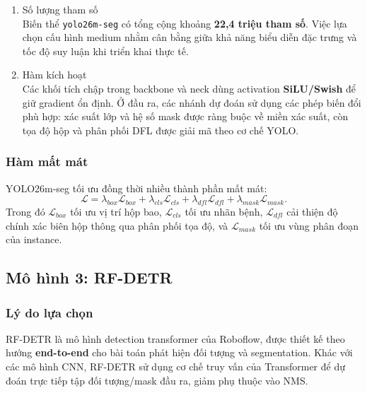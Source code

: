 \begin{enumerate}
\begin{figure}[H]
              \caption{Sơ đồ khối kiến trúc YOLO26m-seg sử dụng trong thực nghiệm}
              \label{fig:yolo26_arch}
          \end{figure}

    \item Số lượng tham số\\
          Biến thể \texttt{yolo26m-seg} có tổng cộng khoảng \textbf{22,4 triệu tham số}. Việc lựa chọn cấu hình medium nhằm cân bằng giữa khả năng biểu diễn đặc trưng và tốc độ suy luận khi triển khai thực tế.

    \item Hàm kích hoạt\\
          Các khối tích chập trong backbone và neck dùng activation \textbf{SiLU/Swish} để giữ gradient ổn định. Ở đầu ra, các nhánh dự đoán sử dụng các phép biến đổi phù hợp: xác suất lớp và hệ số mask được ràng buộc về miền xác suất, còn tọa độ hộp và phân phối DFL được giải mã theo cơ chế YOLO.
\end{enumerate}

\subsubsection{Hàm mất mát}
YOLO26m-seg tối ưu đồng thời nhiều thành phần mất mát:
\[
    \mathcal{L} =
    \lambda_{box}\mathcal{L}_{box}
    + \lambda_{cls}\mathcal{L}_{cls}
    + \lambda_{dfl}\mathcal{L}_{dfl}
    + \lambda_{mask}\mathcal{L}_{mask}.
\]
Trong đó $\mathcal{L}_{box}$ tối ưu vị trí hộp bao, $\mathcal{L}_{cls}$ tối ưu nhãn bệnh, $\mathcal{L}_{dfl}$ cải thiện độ chính xác biên hộp thông qua phân phối tọa độ, và $\mathcal{L}_{mask}$ tối ưu vùng phân đoạn của instance.

\subsection{Mô hình 3: RF-DETR}
\label{subsec:rfdetr}

\subsubsection{Lý do lựa chọn}
RF-DETR là mô hình detection transformer của Roboflow, được thiết kế theo hướng \textbf{end-to-end} cho bài toán phát hiện đối tượng và segmentation. Khác với các mô hình CNN, RF-DETR sử dụng cơ chế truy vấn của Transformer để dự đoán trực tiếp tập đối tượng/mask đầu ra, giảm phụ thuộc vào NMS.

